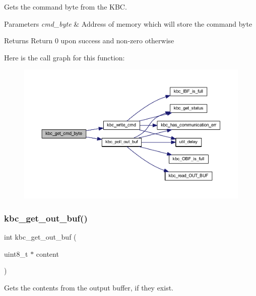 Gets the command byte from the K\+BC. 


\begin{DoxyParams}{Parameters}
{\em cmd\+\_\+byte} & Address of memory which will store the command byte \\
\hline
\end{DoxyParams}
\begin{DoxyReturn}{Returns}
Return 0 upon success and non-\/zero otherwise 
\end{DoxyReturn}
Here is the call graph for this function\+:\nopagebreak
\begin{figure}[H]
\begin{center}
\leavevmode
\includegraphics[width=350pt]{group__keyboard_ga3ab732a7b5d332ab6af5f82456c3528a_cgraph}
\end{center}
\end{figure}
\mbox{\label{group__keyboard_gaa7f7b14e556eec81eb7b4eae1d63ec85}} 
\subsubsection{\texorpdfstring{kbc\+\_\+get\+\_\+out\+\_\+buf()}{kbc\_get\_out\_buf()}}
{\footnotesize\ttfamily int kbc\+\_\+get\+\_\+out\+\_\+buf (\begin{DoxyParamCaption}\item[{uint8\+\_\+t $\ast$}]{content }\end{DoxyParamCaption})}



Gets the contents from the output buffer, if they exist. 


